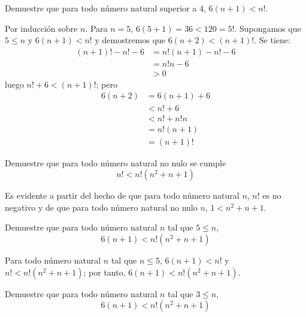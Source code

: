 \begin{exercise}
  Demuestre que para todo número natural superior a $4$, $6(n+1)<n!$.
\end{exercise}

\begin{solution}
  Por inducción sobre $n$. Para $n=5$, $6(5+1)=36<120=5!$. Supongamos
  que $5\leq n$ y $6(n+1)<n!$ y demostremos que $6(n+2)<(n+1)!$. Se tiene:
  \begin{align*}
    (n+1)!-n!-6&=n!(n+1)-n!-6\\
               &=n!n-6\\
               &>0
  \end{align*}
  luego $n!+6<(n+1)!$; pero
  \begin{align*}
    6(n+2)&=6(n+1)+6\\
          &<n!+6\\
          &<n!+n!n\\
          &=n!(n+1)\\
          &=(n+1)!
  \end{align*}
\end{solution}

\begin{exercise}
  Demuestre que para todo número natural no nulo se cumple
  \begin{equation*}
    n!<n!(n^{2}+n+1)
  \end{equation*}
\end{exercise}

\begin{solution}
  Es evidente a partir del hecho de que para todo número natural $n$,
  $n!$ es no negativo y de que para todo número natural no nulo $n$,
  $1<n^{2}+n+1$.
\end{solution}

\begin{exercise}
  Demuestre que para todo número natural $n$ tal que $5\leq n$,
  \begin{equation*}
    6(n+1)<n!(n^{2}+n+1)
  \end{equation*}
\end{exercise}

\begin{solution}
  Para todo número natural $n$ tal que $n\leq 5$, $6(n+1)<n!$ y
  $n!<n!(n^{2}+n+1)$; por tanto, $6(n+1)<n!(n^{2}+n+1)$.
\end{solution}

\begin{exercise}
  Demuestre que para todo número natural $n$ tal que $3\leq n$,
  \begin{equation*}
    6(n+1)<n!(n^{2}+n+1)
  \end{equation*}
\end{exercise}

